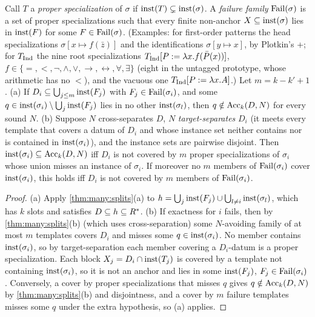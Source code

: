 \begin{corollary}\label{cor:many:failure}
Call $T$ a \emph{proper specialization} of $\sigma$ if $\mathrm{inst}(T)\subsetneq\mathrm{inst}(\sigma)$. A \emph{failure family}
$\mathrm{Fail}(\sigma)$ is a set of proper specializations such that every finite non-anchor $X\subseteq\mathrm{inst}(\sigma)$ lies in
$\mathrm{inst}(F)$ for some $F\in\mathrm{Fail}(\sigma)$. (Examples: for first-order patterns the head specializations $\sigma[x\mapsto
f(\bar z)]$ and the identifications $\sigma[y\mapsto x]$, by Plotkin's \evR{}+\evD{}; for $T_{\mathrm{Ind}}$ the nine root
specializations $T_{\mathrm{Ind}}[P:=\lambda x.f(\bar P(x))]$, $f\in\{=,<,\neg,\wedge,\vee,\to,\leftrightarrow,\forall,\exists\}$
(eight in the untagged prototype, whose arithmetic has no $<$), and the vacuous one $T_{\mathrm{Ind}}[P:=\lambda x.A]$.) Let $m=k-k'+1$.
(a) If $D_i\subseteq\bigcup_{j\le m}\mathrm{inst}(F_j)$ with $F_j\in\mathrm{Fail}(\sigma_i)$, and some $q\in\mathrm{inst}(\sigma_i)\setminus
\bigcup_j\mathrm{inst}(F_j)$ lies in no other $\mathrm{inst}(\sigma_l)$, then $q\notin\mathrm{Acc}_k(D,N)$ for every sound $N$.
(b) Suppose $N$ cross-separates $D$, $N$ \emph{target-separates} $D_i$ (it meets every template that covers a datum of
$D_i$ and whose instance set neither contains nor is contained in $\mathrm{inst}(\sigma_i)$), and the instance sets are pairwise
disjoint. Then $\mathrm{inst}(\sigma_i)\subseteq\mathrm{Acc}_k(D,N)$ iff $D_i$ is not covered by $m$ proper specializations of $\sigma_i$
whose union misses an instance of $\sigma_i$. If moreover no $m$ members of $\mathrm{Fail}(\sigma_i)$ cover $\mathrm{inst}(\sigma_i)$,
this holds iff $D_i$ is not covered by $m$ members of $\mathrm{Fail}(\sigma_i)$.
\end{corollary}
\begin{proof}
(a) Apply \cref{thm:many:splits}(a) to $h=\bigcup_j\mathrm{inst}(F_j)\cup\bigcup_{l\neq i}\mathrm{inst}(\sigma_l)$, which has $k$ slots and
satisfies $D\subseteq h\subseteq R^{*}$.
(b) If exactness for $i$ fails, then by \cref{thm:many:splits}(b) (which uses cross-separation) some $N$-avoiding family
of at most $m$ templates covers $D_i$ and misses some $q\in\mathrm{inst}(\sigma_i)$. No member contains $\mathrm{inst}(\sigma_i)$, so by
target-separation each member covering a $D_i$-datum is a proper specialization. Each block $X_j=D_i\cap\mathrm{inst}(T_j)$ is
covered by a template not containing $\mathrm{inst}(\sigma_i)$, so it is not an anchor and lies in some $\mathrm{inst}(F_j)$,
$F_j\in\mathrm{Fail}(\sigma_i)$. Conversely, a cover by proper specializations that misses $q$ gives $q\notin\mathrm{Acc}_k(D,N)$ by
\cref{thm:many:splits}(b) and disjointness, and a cover by $m$ failure templates misses some $q$ under the extra hypothesis,
so (a) applies.
\end{proof}

